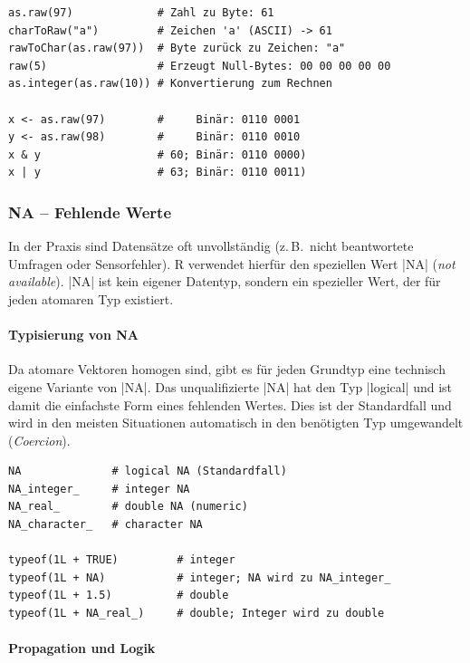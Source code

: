 \documentclass[10pt,twocolumn]{scrartcl}
\renewcommand{\lstinline}{\mycoloredinline}
\begin{document}
\begin{lstlisting}
as.raw(97)             # Zahl zu Byte: 61
charToRaw("a")         # Zeichen 'a' (ASCII) -> 61
rawToChar(as.raw(97))  # Byte zurück zu Zeichen: "a"
raw(5)                 # Erzeugt Null-Bytes: 00 00 00 00 00
as.integer(as.raw(10)) # Konvertierung zum Rechnen

x <- as.raw(97)        #     Binär: 0110 0001
y <- as.raw(98)        #     Binär: 0110 0010
x & y                  # 60; Binär: 0110 0000)
x | y                  # 63; Binär: 0110 0011)
\end{lstlisting}


\subsubsection{NA -- Fehlende Werte}

In der Praxis sind Datensätze oft unvollständig (z.\,B.\ nicht beantwortete Umfragen oder Sensorfehler). R verwendet hierfür den speziellen Wert \lstinline|NA| (\emph{not available}). \lstinline|NA| ist kein eigener Datentyp, sondern ein spezieller Wert, der für jeden atomaren Typ existiert.

\paragraph{Typisierung von NA}

Da atomare Vektoren homogen sind, gibt es für jeden Grundtyp eine technisch eigene Variante von \lstinline|NA|. Das unqualifizierte \lstinline|NA| hat den Typ \lstinline|logical| und ist damit die einfachste Form eines fehlenden Wertes. Dies ist der Standardfall und wird in den meisten Situationen automatisch in den benötigten Typ umgewandelt (\emph{Coercion}).

\begin{lstlisting}
NA              # logical NA (Standardfall)
NA_integer_     # integer NA
NA_real_        # double NA (numeric)
NA_character_   # character NA

typeof(1L + TRUE)         # integer
typeof(1L + NA)           # integer; NA wird zu NA_integer_
typeof(1L + 1.5)          # double
typeof(1L + NA_real_)     # double; Integer wird zu double
\end{lstlisting}

\paragraph{Propagation und Logik}
\end{document}
